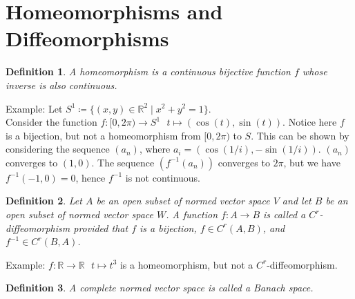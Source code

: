 \documentclass[15pt]{book}
\theoremstyle{break}
\theoremstyle{break}
\newtheorem{defn}{Definition}[corL]
\newcommand{\R}{\mathbb{R}}
\newcommand{\example}{\color{green}Example: \color{black}}
\begin{document}
\newpage
\section[Homeomorphisms and Diffeomorphisms]{\color{red} Homeomorphisms and Diffeomorphisms \color{black}}

\begin{defn}
A homeomorphism is a continuous bijective function $f$ whose inverse is also continuous. 
\end{defn} 

\example Let $S^1\coloneqq\{(x,y) \in\R^2 \mid x^2 + y^2 = 1\}$.\\
Consider the function $f:[0,2\pi) \to S^1 \ \ \ t\mapsto (\cos(t),\sin(t))$. Notice here $f$ is a bijection, but not a homeomorphism from $[0,2\pi)$ to $S$. This can be shown by considering the sequence $(a_n)$, where $a_i = (\cos(1/i),-\sin(1/i))$. $(a_n)$ converges to $(1,0)$. The sequence $(f^{-1}(a_n))$ converges to $2\pi$, but we have $f^{-1}(-1,0) = 0$, hence $f^{-1}$ is not continuous.

\begin{defn}
Let $A$ be an open subset of normed vector space $V$ and let $B$ be an open subset of normed vector space $W$. A function $f:A \to B$ is called a $C^r$-diffeomorphism provided that $f$ is a bijection, $f\in C^r(A,B)$, and $f^{-1} \in C^r(B,A)$.
\end{defn}

\example $f:\R \to \R \ \ \ t\mapsto t^3$ is a homeomorphism, but not a $C^r$-diffeomorphism. 

\begin{defn}
A complete normed vector space is called a Banach space.
\end{defn}
\end{document}
